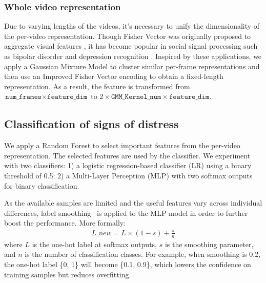 \subsubsection{Whole video representation}
Due to varying lengths of the videos, it's necessary to unify the dimensionality of the per-video representation. 
Though Fisher Vector was originally proposed to aggregate visual features \cite{perronnin2010improving}, it has become popular in social signal processing such as bipolar disorder \cite{syed2018automated} and depression recognition \cite{dhall2015temporally}.
Inspired by these applications, we apply a Gaussian Mixture Model to cluster similar per-frame representations and then use an Improved Fisher Vector encoding to obtain a fixed-length representation. As a result, the feature is transformed from $\texttt{num\_frames} \times \texttt{feature\_dim}$ to $2 \times \texttt{GMM\_Kernel\_num} \times \texttt{feature\_dim}$.

\vspace{-0.1cm}
\subsection{Classification of signs of distress} \label{sec:Distress_classification}
We apply a Random Forest to select important features from the per-video representation. The selected features are used by the classifier. We experiment with two classifiers: 1) a logistic regression-based classifier (LR) using a binary threshold of 0.5; 2) a Multi-Layer Perception (MLP) with two softmax outputs for binary classification.

As the available samples are limited and the useful features vary across individual differences, label smoothing~\cite{muller2019does} is applied to the MLP model in order to further boost the performance. 
More formally:
\begin{equation}
\begin{split}
    L\_new = L \times (1 - s) + \frac{s}{n}
\end{split}
\end{equation}
where $L$ is the one-hot label at softmax outputs, $s$ is the smoothing parameter, and $n$ is the number of classification classes.
For example, when smoothing is 0.2, the one-hot label \{0, 1\} will become \{0.1, 0.9\}, which lowers the confidence on training samples but reduces overfitting.
